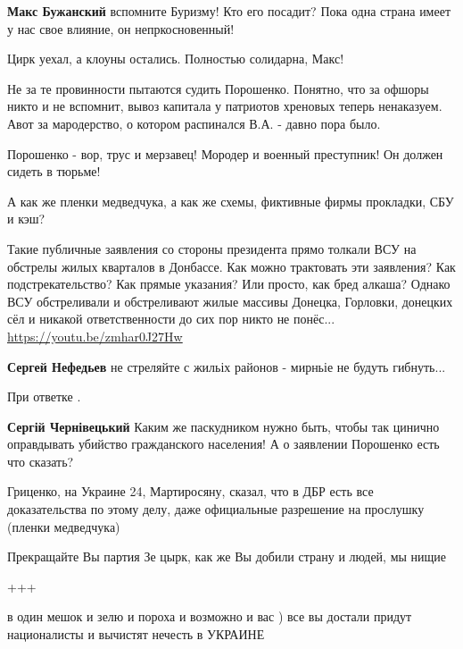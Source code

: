 \begin{itemize}
\begin{itemize}
\textbf{Макс Бужанский} вспомните Буризму! Кто его посадит? Пока одна страна имеет у нас свое влияние, он непркосновенный!
\end{itemize} %

Цирк уехал, а клоуны остались. Полностью солидарна, Макс!


Не за те провинности пытаются судить Порошенко. Понятно, что за офшоры никто и
не вспомнит, вывоз капитала у патриотов хреновых теперь ненаказуем. Авот за
мародерство, о котором распинался В.А. - давно пора было.

Порошенко - вор, трус и мерзавец! Мородер и военный преступник! Он должен сидеть в тюрьме!

А как же пленки медведчука, а как же схемы, фиктивные фирмы прокладки, СБУ и кэш?


Такие публичные заявления со стороны президента прямо толкали ВСУ на обстрелы
жилых кварталов в Донбассе. Как можно трактовать эти заявления? Как
подстрекательство? Как прямые указания? Или просто, как бред алкаша? Однако ВСУ
обстреливали и обстреливают жилые массивы Донецка, Горловки, донецких сёл и
никакой ответственности до сих пор никто не понёс...
\url{https://youtu.be/zmhar0J27Hw}

\begin{itemize} %
\textbf{Сергей Нефедьев} не стреляйте с жильіх районов - мирньіе не будуть гибнуть...

При ответке .

\textbf{Сергій Чернівецький} Каким же паскудником нужно быть, чтобы так цинично оправдывать убийство гражданского населения! А о заявлении Порошенко есть что сказать?
\end{itemize} %


Гриценко, на Украине 24, Мартиросяну, сказал, что в ДБР есть все доказательства
по этому делу, даже официальные разрешение на прослушку (пленки медведчука)

Прекращайте Вы партия Зе цырк, как же Вы добили страну и людей, мы нищие

+++


в один мешок и зелю и пороха и возможно и вас ) все вы достали придут
националисты и вычистят нечесть в УКРАИНЕ


\end{itemize}
